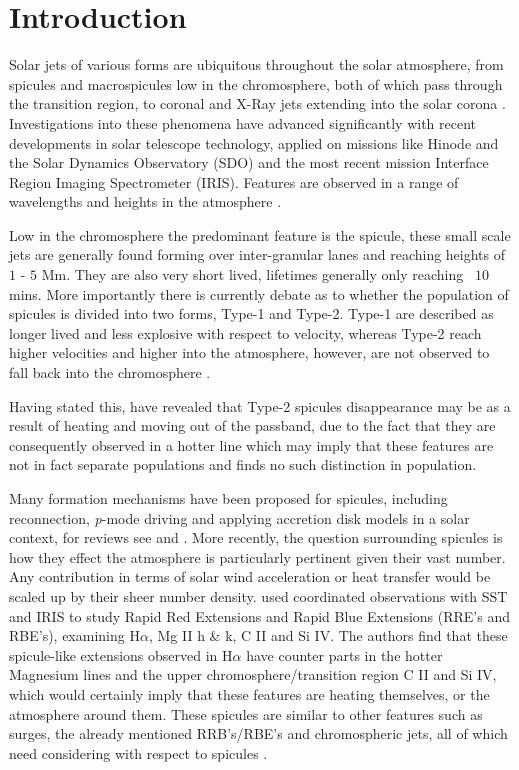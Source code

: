 \documentclass{emulateapj}
\begin{document}
\section{Introduction}
Solar jets of various forms are ubiquitous throughout the solar atmosphere, from spicules and macrospicules low in the chromosphere, both of which pass through the transition region, to coronal and X-Ray jets extending into the solar corona \cite{Archonits2008,Majarska2011,Morton2012}. 
Investigations into these phenomena have advanced significantly with recent developments in solar telescope technology, applied on missions like Hinode and the Solar Dynamics Observatory (SDO) and the most recent mission Interface Region Imaging Spectrometer (IRIS).
Features are observed in a range of wavelengths and heights in the atmosphere \citep{Wang1998,Yamaucho2004}. 

Low in the chromosphere the predominant feature is the spicule, these small scale jets are generally found forming over inter-granular lanes and reaching heights of $1$ - $5$ Mm.
They are also very short lived, lifetimes generally only reaching ~$10$ mins.
More importantly there is currently debate as to whether the population of spicules is divided into two forms, Type-1 and Type-2. 
Type-1 are described as longer lived and less explosive with respect to velocity, whereas Type-2 reach higher velocities and higher into the atmosphere, however, are not observed to fall back into the chromosphere \cite{DePontieu2007,Beckers1968,Sterling2000}. 

Having stated this, \cite{Pereira2014} have revealed that Type-2 spicules disappearance may be as a result of heating and moving out of the passband, due to the fact that they are consequently observed in a hotter line which may imply that these features are not in fact separate populations and \cite{Zhang2012} finds no such distinction in population.

Many formation mechanisms have been proposed for spicules, including reconnection, \emph{p}-mode driving and applying accretion disk models in a solar context, for reviews see \cite{Sterling2000} and \cite{Zaqara_Erdelyi2009}.
More recently, the question surrounding spicules is how they effect the atmosphere is particularly pertinent given their vast number. 
Any contribution in terms of solar wind acceleration or heat transfer would be scaled up by their sheer number density.
\cite{Rouppe2015} used coordinated observations with SST and IRIS to study Rapid Red Extensions and Rapid Blue Extensions (RRE's and RBE's), examining H$\alpha$, Mg II h \& k, C II and Si IV.
The authors find that these spicule-like extensions observed in H$\alpha$ have counter parts in the hotter Magnesium lines and the upper chromosphere/transition region C II and Si IV, which would certainly imply that these features are heating themselves, or the atmosphere around them.
These spicules are similar to other features such as surges, the already mentioned RRB's/RBE's and chromospheric jets, all of which need considering with respect to spicules \cite{Tsiropoula2012,Kuridze2015}.
\end{document}
